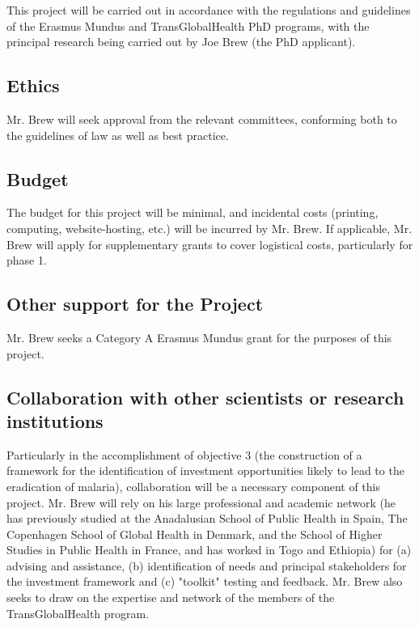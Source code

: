 \documentclass{article}
\begin{document}
\begin{multicols}{2}
This project will be carried out in accordance with the regulations and guidelines of the Erasmus Mundus and TransGlobalHealth PhD programs, with the principal research being carried out by Joe Brew (the PhD applicant). 

\subsection*{Ethics}

Mr. Brew will seek approval from the relevant committees, conforming both to the guidelines of law as well as best practice.



\subsection*{Budget}
The budget for this project will be minimal, and incidental costs (printing, computing, website-hosting, etc.) will be incurred by Mr. Brew. If applicable, Mr. Brew will apply for supplementary grants to cover logistical costs, particularly for phase 1.

\subsection*{Other support for the Project}

Mr. Brew seeks a Category A Erasmus Mundus grant for the purposes of this project.

\subsection*{Collaboration with other scientists or research institutions}

Particularly in the accomplishment of objective 3 (the construction of a framework for the identification of investment opportunities likely to lead to the eradication of malaria), collaboration will be a necessary component of this project.  Mr. Brew will rely on his large professional and academic network (he has previously studied at the Anadalusian School of Public Health in Spain, The Copenhagen School of Global Health in Denmark, and the School of Higher Studies in Public Health in France, and has worked in Togo and Ethiopia) for (a) advising and assistance, (b) identification of needs and principal stakeholders for the investment framework and (c) "toolkit" testing and feedback.  Mr. Brew also seeks to draw on the expertise and network of the members of the TransGlobalHealth program.


\end{multicols}
\end{document}

